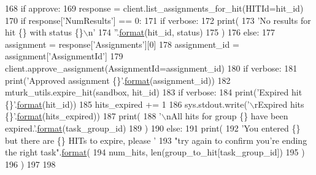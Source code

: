 \begin{DoxyCode}
168                     \textcolor{keywordflow}{if} approve:
169                         response = client.list\_assignments\_for\_hit(HITId=hit\_id)
170                         \textcolor{keywordflow}{if} response[\textcolor{stringliteral}{'NumResults'}] == 0:
171                             \textcolor{keywordflow}{if} verbose:
172                                 print(
173                                     \textcolor{stringliteral}{'No results for hit \{\} with status \{\}\(\backslash\)n'}
174                                     \textcolor{stringliteral}{''}.\hyperlink{namespaceparlai_1_1chat__service_1_1services_1_1messenger_1_1shared__utils_a32e2e2022b824fbaf80c747160b52a76}{format}(hit\_id, status)
175                                 )
176                         \textcolor{keywordflow}{else}:
177                             assignment = response[\textcolor{stringliteral}{'Assignments'}][0]
178                             assignment\_id = assignment[\textcolor{stringliteral}{'AssignmentId'}]
179                             client.approve\_assignment(AssignmentId=assignment\_id)
180                             \textcolor{keywordflow}{if} verbose:
181                                 print(\textcolor{stringliteral}{'Approved assignment \{\}'}.\hyperlink{namespaceparlai_1_1chat__service_1_1services_1_1messenger_1_1shared__utils_a32e2e2022b824fbaf80c747160b52a76}{format}(assignment\_id))
182                     mturk\_utils.expire\_hit(sandbox, hit\_id)
183                     \textcolor{keywordflow}{if} verbose:
184                         print(\textcolor{stringliteral}{'Expired hit \{\}'}.\hyperlink{namespaceparlai_1_1chat__service_1_1services_1_1messenger_1_1shared__utils_a32e2e2022b824fbaf80c747160b52a76}{format}(hit\_id))
185                     hits\_expired += 1
186                     sys.stdout.write(\textcolor{stringliteral}{'\(\backslash\)rExpired hits \{\}'}.\hyperlink{namespaceparlai_1_1chat__service_1_1services_1_1messenger_1_1shared__utils_a32e2e2022b824fbaf80c747160b52a76}{format}(hits\_expired))
187                 print(
188                     \textcolor{stringliteral}{'\(\backslash\)nAll hits for group \{\} have been expired.'}.\hyperlink{namespaceparlai_1_1chat__service_1_1services_1_1messenger_1_1shared__utils_a32e2e2022b824fbaf80c747160b52a76}{format}(task\_group\_id)
189                 )
190             \textcolor{keywordflow}{else}:
191                 print(
192                     \textcolor{stringliteral}{'You entered \{\} but there are \{\} HITs to expire, please '}
193                     \textcolor{stringliteral}{"try again to confirm you're ending the right task"}.\hyperlink{namespaceparlai_1_1chat__service_1_1services_1_1messenger_1_1shared__utils_a32e2e2022b824fbaf80c747160b52a76}{format}(
194                         num\_hits, len(group\_to\_hit[task\_group\_id])
195                     )
196                 )
197 
198 
\end{DoxyCode}
